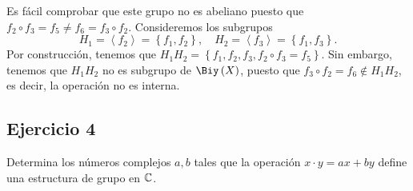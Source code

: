 \documentclass{article}
\begin{document}
 Es fácil comprobar que este grupo no es abeliano puesto que $\displaystyle f_{2} \circ f_{3} = f_{5} \neq f_{6} = f_{3}\circ f_{2} $. Consideremos los subgrupos 
\[ H_{1} = \left\langle f_{2} \right\rangle = \left\{ f_{1}, f_{2}\right\}, \quad H_{2} = \left\langle f_{3} \right\rangle = \left\{ f_{1}, f_{3}\right\}  .\]
Por construcción, tenemos que $\displaystyle H_{1}H_{2} = \left\{ f _{1}, f_{2}, f_{3}, f_{2}\circ f_{3} = f_{5}\right\}  $. Sin embargo, tenemos que $\displaystyle H_{1}H_{2} $ no es subgrupo de $\displaystyle \Biy\left(X\right) $, puesto que $\displaystyle f_{3}\circ f_{2} = f_{6} \not\in H_{1}H_{2} $, es decir, la operación no es interna.
\subsection*{Ejercicio 4}
Determina los números complejos $\displaystyle a,b $ tales que la operación $\displaystyle x \cdot y = ax + by $ define una estructura de grupo en $\displaystyle \mathbb{C} $.
\end{document}
